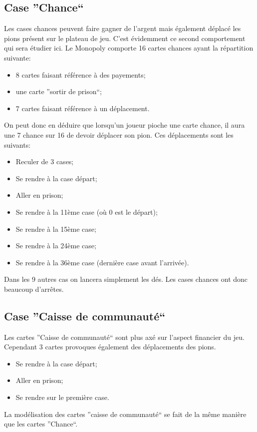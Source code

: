 \documentclass[letterpaper]{article}
\begin{document}
  \subsection{Case ''Chance``}
    Les cases chances peuvent faire gagner de l'argent mais également déplacé les pions 
    présent sur le plateau de jeu.  C'est évidemment ce second comportement qui sera
    étudier ici.  Le Monopoly comporte 16 cartes chances ayant la répartition suivante:
    \begin{itemize}
     \item 8 cartes faisant référence à des payements;
     \item une carte ''sortir de prison``;
     \item 7 cartes faisant référence à un déplacement.
    \end{itemize}
    On peut donc en déduire que lorsqu'un joueur pioche une carte chance, il aura une 
    7 chance sur 16 de devoir déplacer son pion.  Ces déplacements sont les suivants:
    \begin{itemize}
     \item Reculer de 3 cases;
     \item Se rendre à la case départ;
     \item Aller en prison;
     \item Se rendre à la 11ème case (où 0 est le départ);
     \item Se rendre à la 15ème case;
     \item Se rendre à la 24ème case;
     \item Se rendre à la 36ème case (dernière case avant l'arrivée).
    \end{itemize}
    Dans les 9 autres cas on lancera simplement les dés.  Les cases chances ont donc 
    beaucoup d'arrêtes.
    
  \subsection{Case ''Caisse de communauté``}
    Les cartes ''Caisse de communauté`` sont plus axé sur l'aspect financier du jeu.
    Cependant 3 cartes provoques également des déplacements des pions.
    \begin{itemize}
     \item Se rendre à la case départ;
     \item Aller en prison;
     \item Se rendre sur le première case.
    \end{itemize}
    La modélisation des cartes ''caisse de communauté`` se fait de la même manière que 
    les cartes ''Chance``.
    
\end{document}
